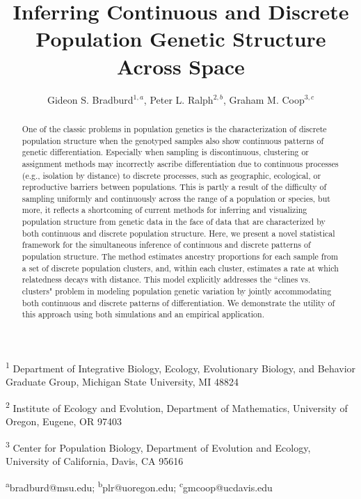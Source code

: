 \documentclass[12pt]{article}
\title{Inferring Continuous and Discrete Population Genetic Structure Across Space}
\date{\vspace{-5ex}}
\author{
Gideon S. Bradburd$^{1,a}$, 
Peter L. Ralph$^{2,b}$, 
Graham M. Coop$^{3,c}$}
\begin{document}
\maketitle

\textsuperscript{1}
Department of Integrative Biology, 
Ecology, Evolutionary Biology, and Behavior Graduate Group,
Michigan State University, MI 48824

\textsuperscript{2}
Institute of Ecology and Evolution,
Department of Mathematics,
University of Oregon, Eugene, OR 97403

\textsuperscript{3}
Center for Population Biology,
Department of Evolution and Ecology, 
University of California, Davis, CA 95616

\textsuperscript{a}bradburd@msu.edu; 
\textsuperscript{b}plr@uoregon.edu;
\textsuperscript{c}gmcoop@ucdavis.edu\\\\\

\newpage
 

\begin{abstract}
One of the classic problems in population genetics is the characterization 
of discrete population structure when the genotyped samples also show 
continuous patterns of genetic differentiation.
Especially when sampling is discontinuous, 
clustering or assignment methods may incorrectly ascribe differentiation 
due to continuous processes (e.g., isolation by distance) 
to discrete processes, such as geographic, ecological, or reproductive barriers 
between populations.
This is partly a result of the difficulty of sampling uniformly and continuously 
across the range of a population or species, 
but more, it reflects a shortcoming of current methods for inferring and 
visualizing population structure from genetic data in the face of data 
that are characterized by both continuous and discrete population structure.
Here, we present a novel statistical framework for the simultaneous inference 
of continuous and discrete patterns of population structure.
The method estimates ancestry proportions for each 
sample from a set of discrete population clusters, 
and, within each cluster, estimates a rate at which relatedness decays with distance.
This model explicitly addresses the ``clines vs. clusters" problem in 
modeling population genetic variation by jointly accommodating both 
continuous and discrete patterns of differentiation. 
We demonstrate the utility of this approach using both simulations and an empirical application.
\end{abstract}
\end{document}
